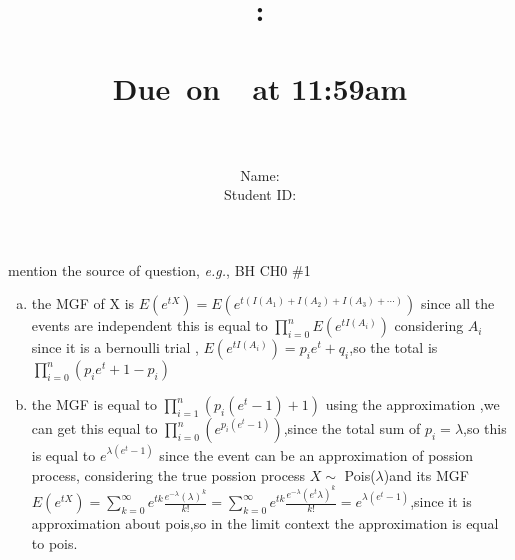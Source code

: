 \documentclass{article}
\title{
    \vspace{2in}
    \textmd{\textbf{\hmwkClass:\\  \hmwkTitle}}\\
    \normalsize\vspace{0.1in}\small{Due\ on\ \hmwkDueDate\ at 11:59am}\\
   \vspace{2in}\Huge{\hmwkClassID}\\   
   \vspace{2in}
}
\author{
	Name: \textbf{\hmwkAuthorName} \\
	Student ID: \hmwkAuthorID}
\date{}
\begin{document}
\maketitle
\pagebreak

\begin{homeworkProblem}{{\color{blue}mention the source of question}, \textit{e.g.}, BH CH0 \#1}
	\begin{enumerate}[(a)]
\item the MGF of X is $E(e^{tX})=E(e^{t(I(A_1)+I(A_2)+I(A_3)+\cdots)})$ since all the events are independent this is equal to $\prod \limits_{i=0}^n E(e^{tI(A_i)})$ considering $A_i$ since it is a bernoulli trial , $E(e^{tI(A_i)})=p_i e^{t}+q_i$,so the total is $\prod \limits_{i=0}^n (p_i e^{t}+1-p_i)$
\item the MGF is equal to $\prod \limits_{i=1}^n(p_i(e^{t}-1)+1)$ using the approximation ,we can get this equal to $\prod \limits_{i=0}^n(e^{p_i(e^{t}-1)})$,since the total sum of $p_i=\lambda$,so this is equal to $e^{\lambda(e^{t}-1)}$ since the event can be an approximation of possion process, considering the true possion process $X\sim $ Pois($\lambda$)and its MGF $E(e^{tX})=\sum\limits_{k=0}^{\infty}e^{tk}\frac{e^{-\lambda}(\lambda)^{k}}{k!}=\sum\limits_{k=0}^{\infty}e^{tk}\frac{e^{-\lambda}(e^{t}\lambda)^k}{k!}=e^{\lambda(e^t-1)}$,since it is approximation about pois,so in the limit context the approximation is equal to pois. 
	\end{enumerate}
\end{homeworkProblem}
\end{document}
